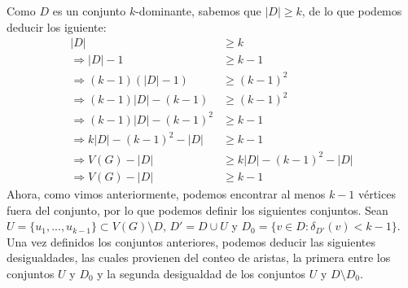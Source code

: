 \documentclass{article}
\begin{document}
Como $D$ es un conjunto $k$-dominante, sabemos que $|D|\geq k$, de lo que podemos deducir los iguiente:\\

\begin{align*}
|D|&\geq k\\
\Longrightarrow |D|-1 &\geq k-1\\
\Longrightarrow (k-1)(|D|-1) &\geq (k-1)^2\\
\Longrightarrow (k-1)|D|-(k-1) &\geq (k-1)^2\\
\Longrightarrow (k-1)|D|-(k-1)^2 &\geq k-1\\
\Longrightarrow k|D|-(k-1)^2 -|D|&\geq k-1\\
\Longrightarrow V(G)-|D|&\geq k|D|-(k-1)^2 -|D|\\
\Longrightarrow V(G)-|D|&\geq k-1
\end{align*}
\newline
Ahora, como vimos anteriormente, podemos encontrar al menos $k-1$ vértices fuera del conjunto, por lo que podemos definir los siguientes conjuntos. Sean $U=\{u_1, ..., u_{k-1}\}\subset V(G)\setminus D$, $D'=D\cup U$ y $D_0=\{v\in D : \delta_{D'}(v)<k-1\}$. \\
Una vez definidos los conjuntos anteriores, podemos deducir las siguientes desigualdades, las cuales provienen del conteo de aristas, la primera entre los conjuntos $U$ y $D_0$ y la segunda desigualdad de los conjuntos $U$ y $D\setminus D_0$.
\end{document}
